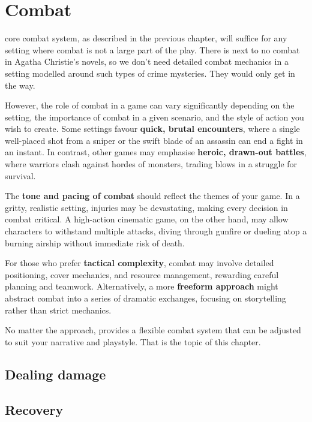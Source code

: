 \chapter{Combat}
\label{chap:combat}

 core combat system, as described in the previous chapter, will suffice for any setting where combat is not a large part of the play. There is next to no combat in Agatha Christie's novels, so we don't need detailed combat mechanics in a setting modelled around such types of crime mysteries. They would only get in the way.

However, the role of combat in a game can vary significantly depending on the setting, the importance of combat in a given scenario, and the style of action you wish to create. Some settings favour \textbf{quick, brutal encounters}, where a single well-placed shot from a sniper or the swift blade of an assassin can end a fight in an instant. In contrast, other games may emphasise \textbf{heroic, drawn-out battles}, where warriors clash against hordes of monsters, trading blows in a struggle for survival.

The \textbf{tone and pacing of combat} should reflect the themes of your game. In a gritty, realistic setting, injuries may be devastating, making every decision in combat critical. A high-action cinematic game, on the other hand, may allow characters to withstand multiple attacks, diving through gunfire or dueling atop a burning airship without immediate risk of death.

For those who prefer \textbf{tactical complexity}, combat may involve detailed positioning, cover mechanics, and resource management, rewarding careful planning and teamwork. Alternatively, a more \textbf{freeform approach} might abstract combat into a series of dramatic exchanges, focusing on storytelling rather than strict mechanics.

No matter the approach, \wyrd provides a flexible combat system that can be adjusted to suit your narrative and playstyle. That is the topic of this chapter.


\section{Dealing damage}
\section{Recovery}

